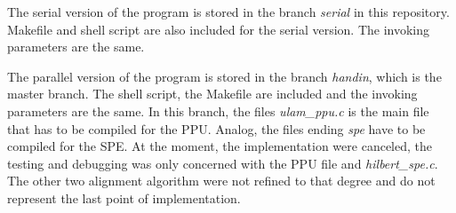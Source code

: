 The serial version of the program is stored in the branch \emph{serial} in this repository. Makefile and shell script are also included for the serial version. The invoking parameters are the same. 

The parallel version of the program is stored in the branch \emph{handin}, which is the master branch. The shell script, the Makefile are included and the invoking parameters are the same.
In this branch, the files \emph{ulam\_ppu.c} is the main file that has to be compiled for the PPU. Analog, the files ending \emph{spe} have to be compiled for the SPE. At the moment, the implementation were canceled, the testing and debugging was only concerned with the PPU file and \emph{hilbert\_spe.c}. The other two alignment algorithm were not refined to that degree and do not represent the last point of implementation.





